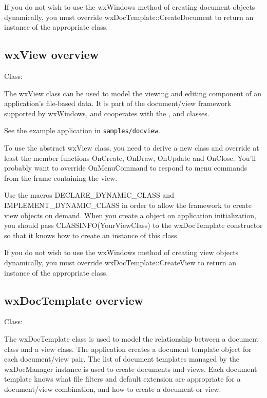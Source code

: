 If you do not wish to use the wxWindows method of creating document
objects dynamically, you must override wxDocTemplate::CreateDocument
to return an instance of the appropriate class.

\subsection{wxView overview}\label{wxviewoverview}


Class: 

The wxView class can be used to model the viewing and editing component of
an application's file-based data. It is part of the document/view framework supported by wxWindows,
and cooperates with the , 
and  classes.

See the example application in {\tt samples/docview}.

To use the abstract wxView class, you need to derive a new class and override
at least the member functions OnCreate, OnDraw, OnUpdate and OnClose. You'll probably
want to override OnMenuCommand to respond to menu commands from the frame containing the
view.

Use the macros DECLARE\_DYNAMIC\_CLASS and IMPLEMENT\_DYNAMIC\_CLASS in order
to allow the framework to create view objects on demand. When you create
a  object on application initialization, you
should pass CLASSINFO(YourViewClass) to the wxDocTemplate constructor
so that it knows how to create an instance of this class.

If you do not wish to use the wxWindows method of creating view
objects dynamically, you must override wxDocTemplate::CreateView
to return an instance of the appropriate class.

\subsection{wxDocTemplate overview}\label{wxdoctemplateoverview}


Class: 

The wxDocTemplate class is used to model the relationship between a
document class and a view class. The application creates a document
template object for each document/view pair. The list of document
templates managed by the wxDocManager instance is used to create
documents and views. Each document template knows what file filters
and default extension are appropriate for a document/view combination,
and how to create a document or view.

